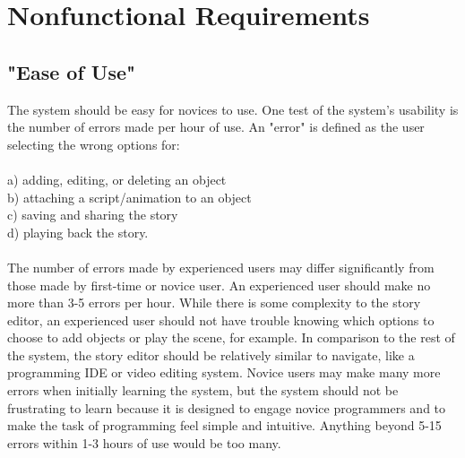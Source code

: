 \documentclass[12pt]{article}
\begin{document}
\section{Nonfunctional Requirements}
	\subsection{"Ease of Use"}
	The system should be easy for novices to use. One test of the system's usability is the
	number of errors made per hour of use. An "error" is defined as the user selecting the
	wrong options for: \\ \\
		\indent a) adding, editing, or deleting an object \\
		\indent b) attaching a script/animation to an object \\
		\indent c) saving and sharing the story \\
		\indent d) playing back the story. \\ \\
	The number of errors made by experienced users may differ significantly from those made
	by first-time or novice user. An experienced user should make no more than 3-5 errors per 			hour. While there is some complexity to the story editor, an experienced user should not
	have trouble knowing which options to choose to add objects or play the scene, for example.
	In comparison to the rest of the system, the story editor should be relatively similar to
	navigate, like a programming IDE or video editing system. Novice users may make many
	more errors when initially learning the system, but the system should not be frustrating to
	learn because it is designed to engage novice programmers and to make the task of programming
	feel simple and intuitive. Anything beyond 5-15 errors within 1-3 hours of use would be too 			many.
	

\end{document}
